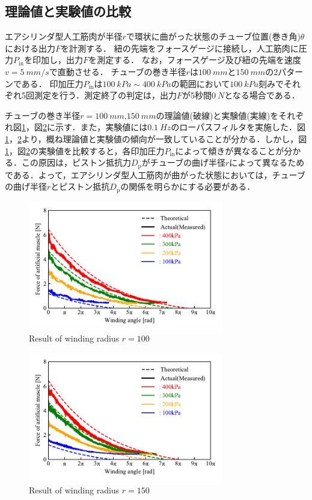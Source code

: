 \subsection{理論値と実験値の比較}%
エアシリンダ型人工筋肉が半径$r$で環状に曲がった状態のチューブ位置(巻き角)$\theta$における出力$F$を計測する．
紐の先端をフォースゲージに接続し，人工筋肉に圧力$P_\mathrm{in}$を印加し，出力$F$を測定する．
なお，フォースゲージ及び紐の先端を速度$v=\SI{5}{mm/s}$で直動させる．
チューブの巻き半径$r$は$\SI{100}{mm}$と$\SI{150}{mm}$の2パターンである．
印加圧力$P_\mathrm{in}$は$\SI{100}{kPa} \sim \SI{400}{kPa}$の範囲において$\SI{100}{kPa}$刻みでそれぞれ5回測定を行う．測定終了の判定は，出力$F$が5秒間$\SI{0}{N}$となる場合である．
\par
チューブの巻き半径$r=\SI{100}{mm}$,$\SI{150}{mm}$の理論値(破線)と実験値(実線)をそれぞれ図\ref{r=100mm}，図\ref{r=150mm}に示す．また，実験値には$\SI{0.1}{Hz}$のローパスフィルタを実施した．図\ref{r=100mm}，\ref{r=150mm}より，概ね理論値と実験値の傾向が一致していることが分かる．しかし，図\ref{r=100mm}，図\ref{r=150mm}の実験値を比較すると，各印加圧力$P_\mathrm{in}$によって傾きが異なることが分かる．この原因は，ピストン抵抗力$D_\mathrm{p}$がチューブの曲げ半径$r$によって異なるためである．よって，エアシリンダ型人工筋肉が曲がった状態においては，チューブの曲げ半径$r$とピストン抵抗$D_\mathrm{p}$の関係を明らかにする必要がある．
\begin{figure}[t]
  \centering
  \includegraphics[width=85mm]{_pdf/result_100mm.pdf}
  \caption{Result of winding radius $r=100$}
  \label{r=100mm}
\end{figure}

\begin{figure}[t]
  \centering
  \includegraphics[width=85mm]{_pdf/result_150mm.pdf}
  \caption{Result of winding radius $r=150$}
  \label{r=150mm}
\end{figure}

